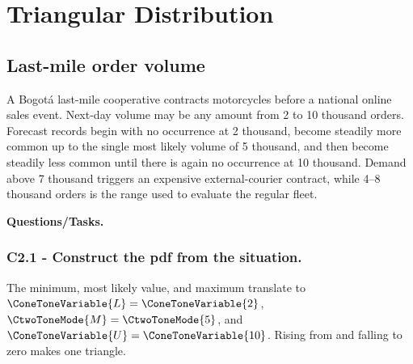 \section{Triangular Distribution}\label{sec:c2-triangular-practice}

\subsection{Last-mile order volume}\label{sec:c2-triangular-lastmile}
A Bogotá last-mile cooperative contracts motorcycles before a national online
sales event.  Next-day volume may be any amount from 2 to 10 thousand orders.
Forecast records begin with no occurrence at 2 thousand, become
steadily more common up to the single most likely volume of 5 thousand, and
then become steadily less common until there is again no occurrence
at 10 thousand.  Demand above 7 thousand triggers an expensive
external-courier contract, while 4--8 thousand orders is the range used to
evaluate the regular fleet.

\begingroup{}
\endgroup

\textbf{Questions/Tasks.}
\begin{enumerate}
\end{enumerate}

\subsubsection*{C2.1 - Construct the pdf from the situation.}
\label{subsec:c2-triangular-lastmile-a}
The minimum, most likely value, and maximum translate to $\ConeToneVariable{L}=\ConeToneVariable{2}$, $\CtwoToneMode{M}=\CtwoToneMode{5}$, and
$\ConeToneVariable{U}=\ConeToneVariable{10}$.  Rising from and falling to zero makes one triangle.

